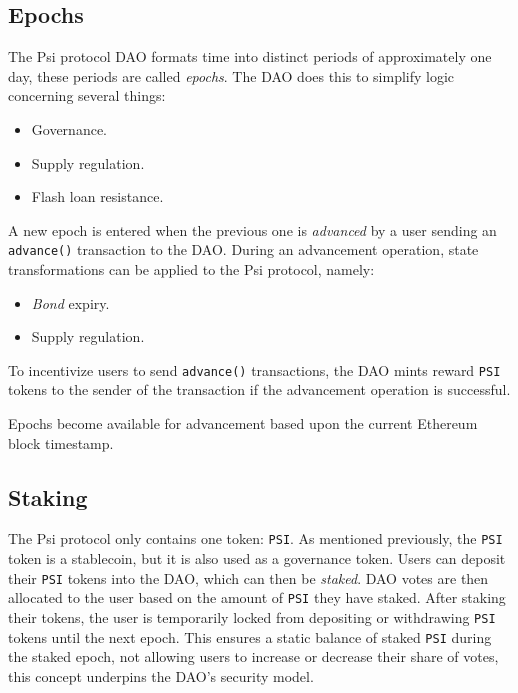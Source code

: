 \documentclass[a4paper, 12pt]{article}
\begin{document}
	\subsection{Epochs}
	The Psi protocol DAO formats time into distinct periods of approximately one day, these periods are called \textit{epochs}.  The DAO does this to simplify logic concerning several things:
	
	\begin{itemize}

		\item{Governance.}
		\item{Supply regulation.}
		\item{Flash loan resistance.}

	\end{itemize}
	
	A new epoch is entered when the previous one is \textit{advanced} by a user sending an \texttt{advance()} transaction to the DAO. During an advancement operation, state transformations can be 				applied to the Psi protocol, namely:

	\begin{itemize}

		\item{\textit{Bond} expiry.}
		\item{Supply regulation.}

	\end{itemize}

	To incentivize users to send \texttt{advance()} transactions, the DAO mints reward \texttt{PSI} tokens to the sender of the transaction if the advancement operation is successful.
	
	Epochs become available for advancement based upon the current Ethereum block timestamp.

	\newpage

	\subsection{Staking}
	The Psi protocol only contains one token: \texttt{PSI}. As mentioned previously, the \texttt{PSI} token is a stablecoin, but it is also used as a governance token. Users can deposit their \texttt{PSI} 			tokens into the DAO, which can then be \textit{staked}. DAO votes are then allocated to the user based on the amount of \texttt{PSI} they have staked. After staking their tokens, the user is 				temporarily locked from depositing or withdrawing \texttt{PSI} tokens until the next epoch. This ensures a static balance of staked \texttt{PSI} during the staked epoch, not allowing users to increase 			or decrease their share of votes, this concept underpins the DAO's security model.
\end{document}
